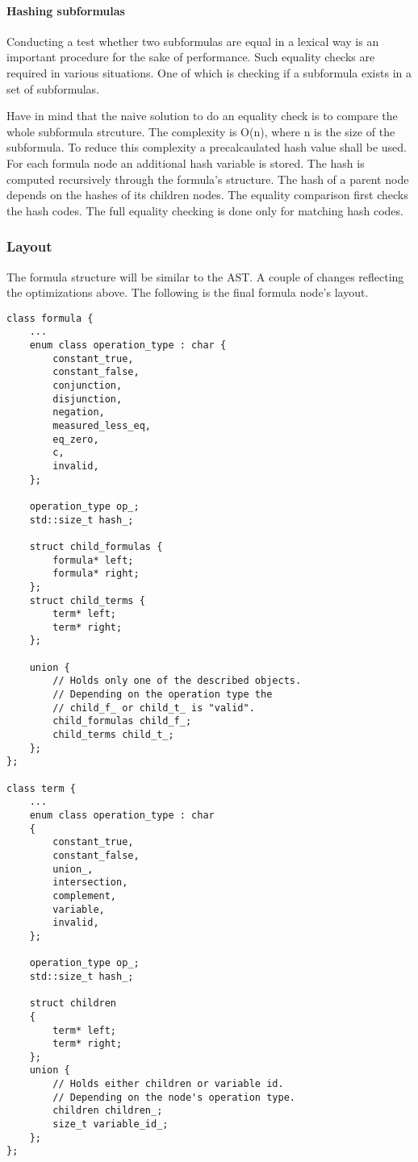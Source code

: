 \documentclass{article}
\begin{document}
	\paragraph{Hashing subformulas}
	Conducting a test whether two subformulas are equal in a lexical way is an important procedure for the sake of performance. Such equality checks are required in various situations. One of which is checking if a subformula exists in a set of subformulas.

	Have in mind that the naive solution to do an equality check is to compare the whole subformula strcuture. The complexity is O(n), where n is the size of the subformula. To reduce this complexity a precalcaulated hash value shall be used.
	For each formula node an additional hash variable is stored. The hash is computed recursively through the formula's structure. The hash of a parent node depends on the hashes of its children nodes. 
	The equality comparison first checks the hash codes. The full equality checking is done only for matching hash codes.

	\newpage
	\subsubsection{Layout}
	The formula structure will be similar to the AST. A couple of changes reflecting the optimizations above. The following is the final formula node's layout.

\begin{lstlisting}
class formula {
    ...
    enum class operation_type : char {
        constant_true,
        constant_false,
        conjunction,
        disjunction,
        negation,
        measured_less_eq,
        eq_zero,
        c,
        invalid,
    };

    operation_type op_;
    std::size_t hash_;

    struct child_formulas {
        formula* left;
        formula* right;
    };
    struct child_terms {
        term* left;
        term* right;
    };

    union {
        // Holds only one of the described objects.
        // Depending on the operation type the
        // child_f_ or child_t_ is "valid".
        child_formulas child_f_;
        child_terms child_t_;
    };
};

class term {
    ...
    enum class operation_type : char
    {
        constant_true,
        constant_false,
        union_,
        intersection,
        complement,
        variable,
        invalid,
    };

    operation_type op_;
    std::size_t hash_;

    struct children
    {
        term* left;
        term* right;
    };
    union {
        // Holds either children or variable id.
        // Depending on the node's operation type.
        children children_;
        size_t variable_id_;
    };
};
\end{lstlisting}
\end{document}
